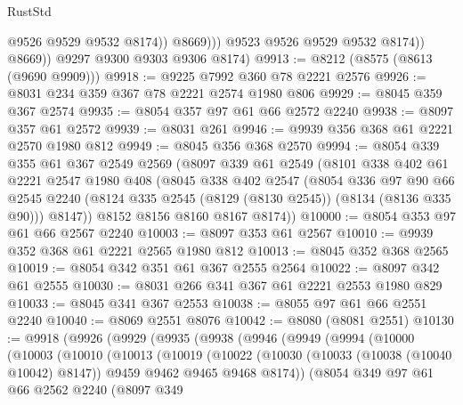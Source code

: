 \begin{lexlean}{RustStd}
\begin{coremodule}
{\begin{coremodule}
{{{{{{{{{{{{{{{{{{{{{{{{{{{{{{{{{{{{{{{{{{{{{{{{{{{{{                        @9526
                        @9529
                        @9532
                        @8174))
                    @8669)))
              @9523
              @9526
              @9529
              @9532
              @8174))
          @8669))
      @9297
      @9300
      @9303
      @9306
      @8174)
@9913 := @8212 (@8575 (@8613 (@9690 @9909)))
@9918 := @9225 @7992 @360 @78 @2221 @2576
@9926 := @8031 @234 @359 @367 @78 @2221 @2574 @1980 @806
@9929 := @8045 @359 @367 @2574
@9935 := @8054 @357 @97 @61 @66 @2572 @2240
@9938 := @8097 @357 @61 @2572
@9939 := @8031 @261
@9946 := @9939 @356 @368 @61 @2221 @2570 @1980 @812
@9949 := @8045 @356 @368 @2570
@9994 := @8054
    @339
    @355
    @61
    @367
    @2549
    @2569
    (@8097
      @339
      @61
      @2549
      (@8101
        @338
        @402
        @61
        @2221
        @2547
        @1980
        @408
        (@8045
          @338
          @402
          @2547
          (@8054
            @336
            @97
            @90
            @66
            @2545
            @2240
            (@8124 @335 @2545 (@8129 (@8130 @2545)) (@8134 (@8136 @335 @90)))
            @8147))
        @8152
        @8156
        @8160
        @8167
        @8174))
@10000 := @8054 @353 @97 @61 @66 @2567 @2240
@10003 := @8097 @353 @61 @2567
@10010 := @9939 @352 @368 @61 @2221 @2565 @1980 @812
@10013 := @8045 @352 @368 @2565
@10019 := @8054 @342 @351 @61 @367 @2555 @2564
@10022 := @8097 @342 @61 @2555
@10030 := @8031 @266 @341 @367 @61 @2221 @2553 @1980 @829
@10033 := @8045 @341 @367 @2553
@10038 := @8055 @97 @61 @66 @2551 @2240
@10040 := @8069 @2551 @8076
@10042 := @8080 (@8081 @2551)
@10130 := @9918
    (@9926
      (@9929
        (@9935
          (@9938
            (@9946
              (@9949
                (@9994
                  (@10000
                    (@10003
                      (@10010
                        (@10013
                          (@10019
                            (@10022
                              (@10030
                                (@10033 (@10038 (@10040 @10042) @8147))
                                @9459
                                @9462
                                @9465
                                @9468
                                @8174))
                            (@8054
                              @349
                              @97
                              @61
                              @66
                              @2562
                              @2240
                              (@8097
                                @349
}}}}}}}}}}}}}}}}}}}}}}}}}}}}}}}}}}}}}}}}}}}}}}}}}}}}}
\end{coremodule}}
\end{coremodule}
\end{lexlean}
